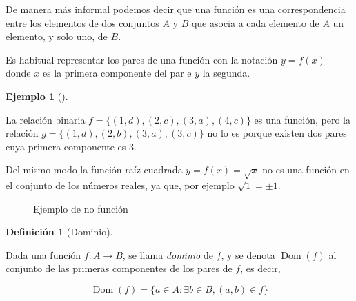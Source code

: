 \documentclass[
  a4paper,
]{scrreport}
\theoremstyle{plain}
\theoremstyle{plain}
\theoremstyle{definition}
\newtheorem{definition}{Definición}[chapter]
\theoremstyle{definition}
\newtheorem{example}{Ejemplo}[chapter]
\theoremstyle{plain}
\theoremstyle{definition}
\theoremstyle{remark}
\begin{document}
De manera más informal podemos decir que una función es una
correspondencia entre los elementos de dos conjuntos \(A\) y \(B\) que
asocia a cada elemento de \(A\) un elemento, y solo uno, de \(B\).

Es habitual representar los pares de una función con la notación
\(y=f(x)\) donde \(x\) es la primera componente del par e \(y\) la
segunda.

\begin{example}[]\protect\hypertarget{exm-funcion}{}\label{exm-funcion}

La relación binaria \(f=\{(1,d), (2,c), (3,a), (4,c)\}\) es una función,
pero la relación \(g=\{(1,d), (2,b), (3,a), (3,c)\}\) no lo es porque
existen dos pares cuya primera componente es \(3\).

Del mismo modo la función raíz cuadrada \(y=f(x)=\sqrt{x}\) no es una
función en el conjunto de los números reales, ya que, por ejemplo
\(\sqrt{1}=\pm 1\).

\end{example}

\begin{figure}

\begin{minipage}[t]{0.50\linewidth}

{\centering 

\raisebox{-\height}{



}

\caption{Ejemplo de función}

}

\end{minipage}%
%
\begin{minipage}[t]{0.50\linewidth}

{\centering 

\raisebox{-\height}{



}

\caption{Ejemplo de no función}

}

\end{minipage}%

\end{figure}

\begin{definition}[Dominio]\protect\hypertarget{def-dominio-funcion}{}\label{def-dominio-funcion}

Dada una función \(f:A\rightarrow B\), se llama \emph{dominio} de \(f\),
y se denota \(\operatorname{Dom}(f)\) al conjunto de las primeras
componentes de los pares de \(f\), es decir,

\[\operatorname{Dom}(f) = \{a\in A: \exists b\in B, (a,b)\in f\}\]

\end{definition}
\end{document}
